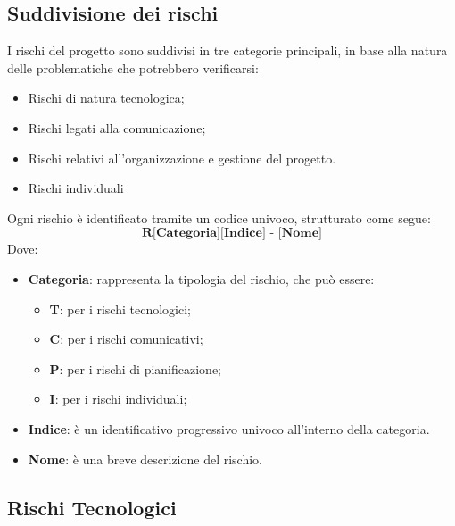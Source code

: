 \documentclass{article}
\begin{document}
    \subsection{Suddivisione dei rischi}
    I rischi del progetto sono suddivisi in tre categorie principali, in base alla natura delle problematiche che potrebbero verificarsi:
    \begin{itemize}
        \item Rischi di natura tecnologica;
        \item Rischi legati alla comunicazione;
        \item Rischi relativi all'organizzazione e gestione del progetto.
        \item Rischi individuali
    \end{itemize}
    Ogni rischio è identificato tramite un codice univoco, strutturato come segue:
    \[
    \textbf{R[Categoria][Indice] - [Nome]}
    \]
    Dove:
    \begin{itemize}
        \item \textbf{Categoria}: rappresenta la tipologia del rischio, che può essere:
        \begin{itemize}
            \item \textbf{T}: per i rischi tecnologici;
            \item \textbf{C}: per i rischi comunicativi;
            \item \textbf{P}: per i rischi di pianificazione;
            \item \textbf{I}: per i rischi individuali;
        \end{itemize}
        \item \textbf{Indice}: è un identificativo progressivo univoco all'interno della categoria.
        \item \textbf{Nome}: è una breve descrizione del rischio.
    \end{itemize}

    \subsection{Rischi Tecnologici}
\end{document}
